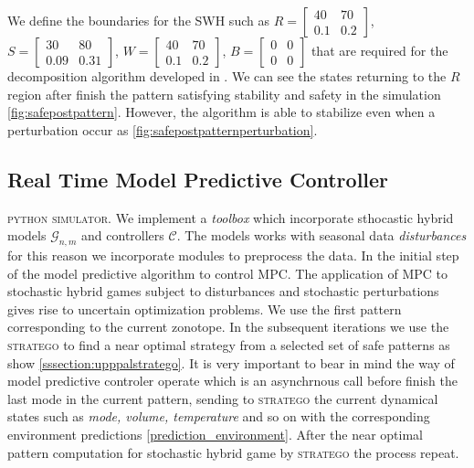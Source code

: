       We define the boundaries for the \ac{SWH} such as 
      $R = \begin{bmatrix} 40 & 70 \\ 0.1 & 0.2
      \end{bmatrix}$, $S = \begin{bmatrix} 30 & 80 \\ 0.09 & 0.31 \end{bmatrix}$,
      $W = \begin{bmatrix} 40 & 70 \\ 0.1 & 0.2 \end{bmatrix}$,
      $B = \begin{bmatrix} 0 & 0 \\ 0 & 0 \end{bmatrix}$ that are required for the 
      decomposition algorithm developed in \cite{liberzon2003switching}. We can 
      see the states returning to the $R$ region after finish the pattern 
      satisfying stability and safety in the simulation \autoref{fig:safepostpattern}.
      However, the algorithm is able to stabilize even when a perturbation 
      occur as \autoref{fig:safepostpatternperturbation}.
      \clearpage        
    \subsection{Real Time Model Predictive Controller}
      \textsc{python simulator}. We implement a \emph{toolbox} which incorporate
      sthocastic hybrid models $\mathcal{G}_{n,m}$ and controllers $\mathcal{C}$.
      The models works with seasonal data  \emph{disturbances} for this reason we 
      incorporate modules to preprocess the data. In the initial step of the model 
      predictive algorithm to control \ac{MPC}. The application of \ac{MPC} to 
      stochastic hybrid games subject to disturbances and
      stochastic perturbations gives rise to uncertain optimization problems.
      We use the first pattern corresponding to the current zonotope. In the subsequent 
      iterations we use the \textsc{stratego} to find a near optimal strategy from a selected
      set of safe patterns as show \ref{sssection:upppalstratego}. It is very important to bear in mind 
      the way of model predictive controler operate which is an asynchrnous call 
      before finish the last mode in the current pattern, sending to \textsc{stratego}
      the current dynamical states such as \emph{mode, volume, temperature} and so on with the
      corresponding environment predictions \ref{prediction_environment}.
      After the near optimal pattern computation for stochastic hybrid game 
      by \textsc{stratego} the process repeat.

